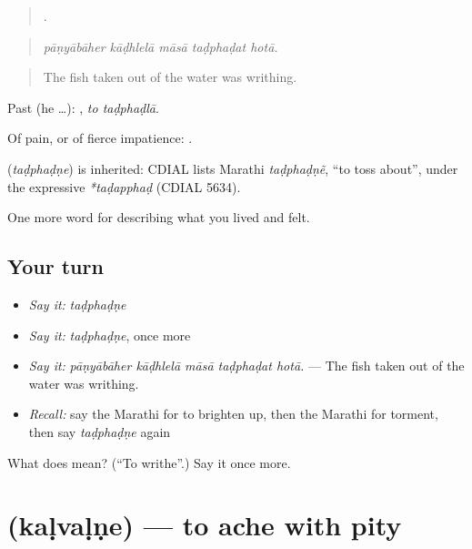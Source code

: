 \begin{quote}
    .
\end{quote}

\begin{quote}
\emph{pāṇyābāher kāḍhlelā māsā taḍphaḍat hotā.}
\end{quote}

\begin{quote}
The fish taken out of the water was writhing.
\end{quote}

Past (he …):  , \emph{to taḍphaḍlā}.

Of pain, or of fierce impatience:  .

\begin{cousinweb}
\textbf{} (\emph{taḍphaḍṇe}) is inherited: CDIAL lists Marathi \emph{taḍphaḍṇẽ}, \textquotedblleft{}to toss about\textquotedblright{}, under the expressive \emph{*taḍapphaḍ} (CDIAL 5634).
\end{cousinweb}

\begin{grammarlens}[title={What you've built}]
One more word for describing what you lived and felt.
\end{grammarlens}

\subsection*{Your turn}
\begin{itemize}
\raggedright
  \item \emph{Say it:} \emph{taḍphaḍṇe}
  \item \emph{Say it:} \emph{taḍphaḍṇe}, once more
  \item \emph{Say it:} \emph{pāṇyābāher kāḍhlelā māsā taḍphaḍat hotā.} — The fish taken out of the water was writhing.
  \item \emph{Recall:} say the Marathi for to brighten up, then the Marathi for torment, then say \emph{taḍphaḍṇe} again
\end{itemize}

\begin{tcolorbox}[breakable,colback=teal!4,colframe=teal!35!black,title={Before you move on}]
What does  mean? (\textquotedblleft{}To writhe\textquotedblright{}.) Say it once more.
\end{tcolorbox}
\section[\texorpdfstring{\mr{कळवळणे} (kaḷvaḷṇe)}{कळवळणे (kaḷvaḷṇe)}]{ (kaḷvaḷṇe) — to ache with pity}

